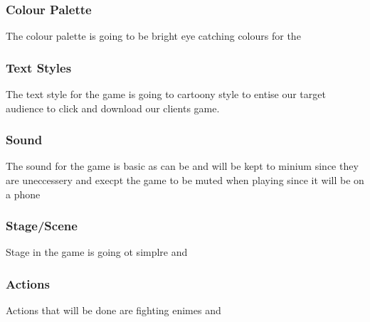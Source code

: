 \documentclass{article}
\begin{document}
\subsubsection{Colour Palette}
The colour palette is going to be bright eye catching colours for the  

\subsubsection{Text Styles}
The text style for the game is going to cartoony style to entise our target audience to click and download our clients game. 

\subsubsection{Sound}
The sound for the game is basic as can be and will be kept to minium since they are uneccessery and execpt the game to be muted when playing since it will be on a phone

\subsubsection{Stage/Scene}
Stage in the game is going ot simplre and 

\subsubsection{Actions}
Actions that will be done are fighting enimes and 
\end{document}
